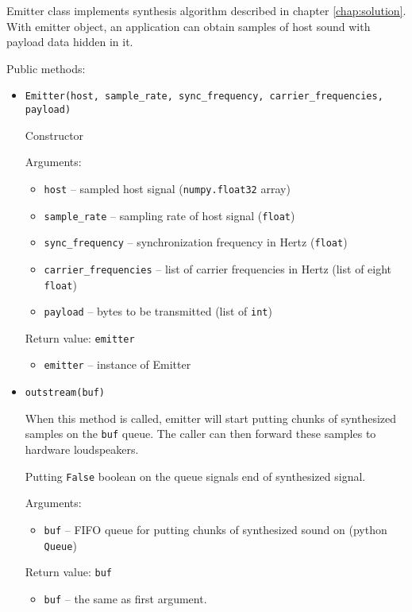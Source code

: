 Emitter class implements synthesis algorithm described in chapter \ref{chap:solution}. With emitter object, an application can obtain samples of host sound with payload data hidden in it.

Public methods:

\begin{itemize}
\item \verb|Emitter(host, sample_rate, sync_frequency, carrier_frequencies, payload)|

  Constructor

  Arguments:
  \begin{itemize}
  \item \verb|host| -- sampled host signal (\verb|numpy.float32| array)
  \item \verb|sample_rate| -- sampling rate of host signal (\verb|float|)
  \item \verb|sync_frequency| -- synchronization frequency in Hertz (\verb|float|)
  \item \verb|carrier_frequencies| -- list of carrier frequencies in Hertz (list of eight \verb|float|)
  \item \verb|payload| -- bytes to be transmitted (list of \verb|int|)
  \end{itemize}

  Return value: \verb|emitter|
  \begin{itemize}
  \item \verb|emitter| -- instance of Emitter
  \end{itemize}

\item \verb|outstream(buf)|

  When this method is called, emitter will start putting chunks of synthesized samples on the \verb|buf| queue. The caller can then forward these samples to hardware loudspeakers.

  Putting \verb|False| boolean on the queue signals end of synthesized signal.

  Arguments:
  \begin{itemize}
  \item \verb|buf| -- FIFO queue for putting chunks of synthesized sound on (python \verb|Queue|)
  \end{itemize}

  Return value: \verb|buf|
  \begin{itemize}
  \item \verb|buf| -- the same as first argument.
  \end{itemize}

\end{itemize}

